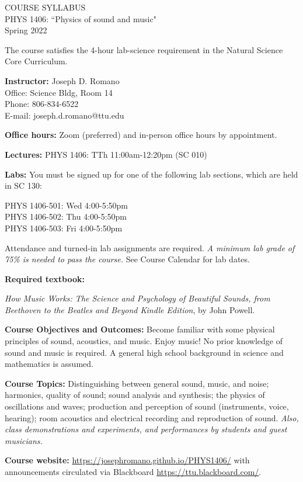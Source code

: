 \documentclass[11pt]{NSF}
\begin{document}
\begin{center}
COURSE SYLLABUS\\
PHYS 1406: ``Physics of sound and music"\\
Spring 2022
\end{center}

The course satisfies the 4-hour lab-science requirement in the Natural Science Core Curriculum.

{\bf Instructor:}
Joseph D. Romano\\
Office: Science Bldg, Room 14\\
Phone: 806-834-6522\\
E-mail: joseph.d.romano@ttu.edu

{\bf Office hours:}
Zoom (preferred) and in-person office hours by appointment.

{\bf Lectures:}
PHYS 1406: TTh 11:00am-12:20pm (SC 010)

{\bf Labs:} You must be signed up for one of the following lab
sections, which are held in SC 130:

PHYS 1406-501: Wed 4:00-5:50pm\\
PHYS 1406-502: Thu 4:00-5:50pm\\
PHYS 1406-503: Fri 4:00-5:50pm

Attendance and turned-in lab assignments are required.
\emph{A minimum lab grade of 75\% is needed to pass the course.}
See Course Calendar for lab dates.

{\bf Required textbook:}

{\em How Music Works: The Science and Psychology of Beautiful Sounds, 
from Beethoven to the Beatles and Beyond Kindle Edition}, by John Powell.

{\bf Course Objectives and Outcomes:}
Become familiar with some physical principles of sound, acoustics, and music. 
Enjoy music!
No prior knowledge of sound and music is required. 
A general high school background in science and mathematics is assumed.

{\bf Course Topics:} 
Distinguishing between general sound, music, and noise;
harmonics, quality of sound; sound analysis and synthesis;
the physics of oscillations and waves;
production and perception of sound (instruments, voice, hearing);
room acoustics and electrical recording and reproduction of sound.
{\em Also, class demonstrations and experiments, and performances by 
students and guest musicians.}

{\bf Course website:}
\url{https://josephromano.github.io/PHYS1406/} with announcements
circulated via Blackboard \url{https://ttu.blackboard.com/}.
\end{document}

